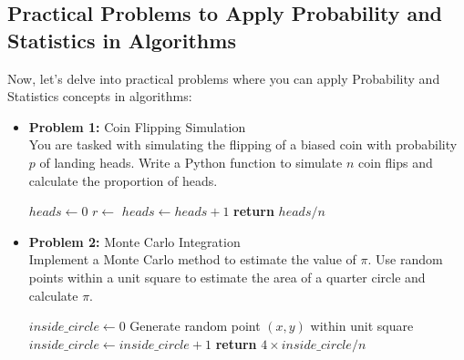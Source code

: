 \documentclass[12pt]{book} %
\begin{document}
\subsection{Practical Problems to Apply Probability and Statistics in Algorithms}
Now, let's delve into practical problems where you can apply Probability and Statistics concepts in algorithms:

\begin{itemize}
    \item \textbf{Problem 1:} Coin Flipping Simulation \\
    You are tasked with simulating the flipping of a biased coin with probability $p$ of landing heads. Write a Python function to simulate $n$ coin flips and calculate the proportion of heads.
    
    \FloatBarrier
    \begin{algorithm}[H]
    \caption{Coin Flipping Simulation}
    \begin{algorithmic}[1]
        \State $heads \gets 0$
            \State $r \gets$  
                \State $heads \gets heads + 1$
            \EndIf
        \EndFor
        \State \textbf{return} $heads / n$ 
    \EndFunction
    \end{algorithmic}
    \end{algorithm}
    \FloatBarrier
    
    \item \textbf{Problem 2:} Monte Carlo Integration \\
    Implement a Monte Carlo method to estimate the value of $\pi$. Use random points within a unit square to estimate the area of a quarter circle and calculate $\pi$.
    
    \FloatBarrier
    \begin{algorithm}[H]
    \caption{Monte Carlo Integration for $\pi$}
    \begin{algorithmic}[1]
        \State $inside\_circle \gets 0$
            \State Generate random point $(x, y)$ within unit square
                \State $inside\_circle \gets inside\_circle + 1$
            \EndIf
        \EndFor
        \State \textbf{return} $4 \times inside\_circle / n$ 
    \EndFunction
    \end{algorithmic}
    \end{algorithm}
    \FloatBarrier
\end{itemize}
\end{document}
